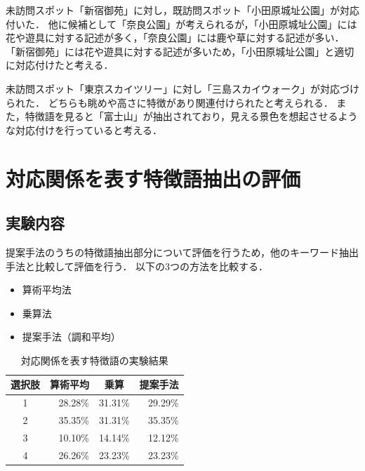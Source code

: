\documentclass[submit]{ipsj}
\begin{document}
未訪問スポット「新宿御苑」に対し，既訪問スポット「小田原城址公園」が対応付いた．
他に候補として「奈良公園」が考えられるが，「小田原城址公園」には花や遊具に対する記述が多く，「奈良公園」には鹿や草に対する記述が多い．
「新宿御苑」には花や遊具に対する記述が多いため，「小田原城址公園」と適切に対応付けたと考える．

未訪問スポット「東京スカイツリー」に対し「三島スカイウォーク」が対応づけられた．
どちらも眺めや高さに特徴があり関連付けられたと考えられる．
また，特徴語を見ると「富士山」が抽出されており，見える景色を想起させるような対応付けを行っていると考える．

\section{対応関係を表す特徴語抽出の評価}
\label{sec:対応関係を表す特徴語抽出の評価}
\subsection{実験内容}
提案手法のうちの特徴語抽出部分について評価を行うため，他のキーワード抽出手法と比較して評価を行う．
以下の3つの方法を比較する．
\begin{itemize}
  \item 算術平均法
  \item 乗算法
  \item 提案手法（調和平均）
\end{itemize}

\begin{table}[t]
  \caption{対応関係を表す特徴語の実験結果}
  \label{table:対応関係を表す特徴語の実験結果}
  \centering
  \begin{tabular}{c|r|r|r}
  \hline \hline
  選択肢 & \multicolumn{1}{c|}{算術平均} & \multicolumn{1}{c|}{乗算} & \multicolumn{1}{c}{提案手法} \\ \hline
  1  & 28.28\%                  & 31.31\%                  & 29.29\%                 \\
  2  & 35.35\%                  & 31.31\%                  & 35.35\%                 \\
  3  & 10.10\%                   & 14.14\%                  & 12.12\%                 \\
  4  & 26.26\%                  & 23.23\%                  & 23.23\%                 \\ \hline
  \end{tabular}
\end{table}
\end{document}
